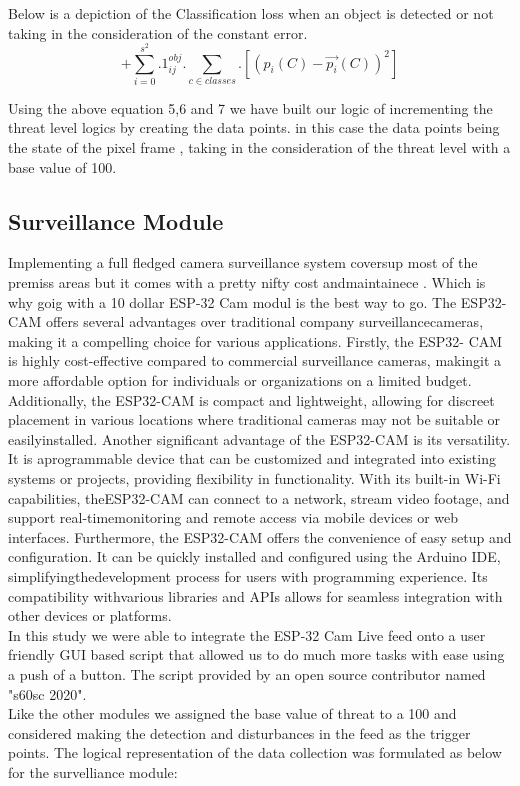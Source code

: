 \documentclass[letterpaper, 10 pt, conference]{ieeeconf}  %
\begin{document}
Below is a depiction of the Classification loss when an object is detected or not taking in the consideration of the constant error.
\begin{equation}
+ \sum_{i=0}^{s^2} . 1_{ij}^{obj} . \sum_{c \in classes} . [(p_i(C) - \vec{p_i}(C))^2]
\end{equation}

Using the above equation 5,6 and 7 we have built our logic of incrementing the threat level logics by creating the data points. in this case the data points being the state of the pixel frame , taking in the consideration of the threat level with a base value of 100.\cite{c2}



\subsection{Surveillance Module}
Implementing a full fledged camera surveillance system coversup most of the premiss
areas but it comes with a pretty nifty cost andmaintainece . Which is why goig with a 10 dollar ESP-32 Cam modul is the best way to go. The ESP32-CAM offers several advantages over traditional company surveillancecameras, making it a compelling choice for various applications. Firstly, the ESP32- CAM is highly cost-effective compared to commercial surveillance cameras, makingit a more affordable option for individuals or organizations on a limited budget. Additionally, the ESP32-CAM is compact and lightweight, allowing for discreet
placement in various locations where traditional cameras may not be suitable or easilyinstalled. Another significant advantage of the ESP32-CAM is its versatility. It is aprogrammable device that can be customized and integrated into existing systems or
projects, providing flexibility in functionality. With its built-in Wi-Fi capabilities, theESP32-CAM can connect to a network, stream video footage, and support real-timemonitoring and remote access via mobile devices or web interfaces. Furthermore, the ESP32-CAM offers the convenience of easy setup and configuration. It can be quickly installed and configured using the Arduino IDE, simplifyingthedevelopment process for users with programming experience. Its compatibility withvarious libraries and APIs allows for seamless integration with other devices or platforms.\\
In this study we were able to integrate the ESP-32 Cam Live feed onto a user friendly GUI based script that allowed us to do much more tasks with ease using a push of a button. The script provided by an open source contributor named "s60sc 2020". \\
Like the other modules we assigned the base value of threat to a 100 and considered making the detection and disturbances in the feed as the trigger points. The logical representation of the data collection was formulated as below for the survelliance module:
\end{document}
